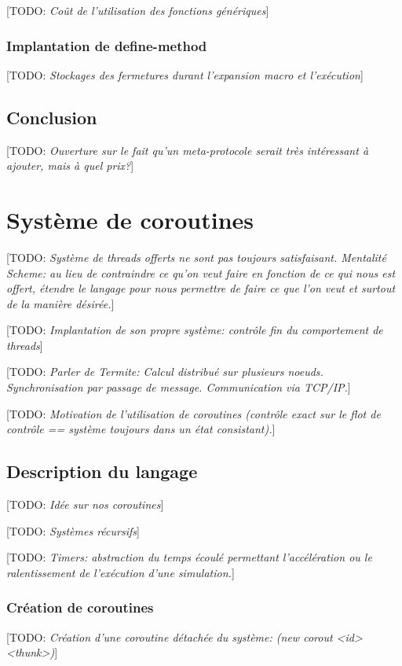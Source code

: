 \documentclass[12pt,oneside,letterpaper,francais]{book}
\newcommand{\todo}[1]{[TODO: {\it #1}]}
\begin{document}
\todo{Coût de l'utilisation des fonctions génériques}

\subsection{Implantation de define-method}
\todo{Stockages des fermetures durant l'expansion macro et l'exécution}




\section{Conclusion}
\todo{Ouverture sur le fait qu'un meta-protocole serait très intéressant à
  ajouter, mais à quel prix?}



\chapter{Système de coroutines}
\todo{Système de threads offerts ne sont pas toujours
  satisfaisant. Mentalité Scheme: au lieu de contraindre ce qu'on veut
  faire en fonction de ce qui nous est offert, étendre le langage pour
  nous permettre de faire ce que l'on veut et surtout de la manière
  désirée.}

\todo{Implantation de son propre système: contrôle fin du comportement
  de threads}

\todo{Parler de Termite: Calcul distribué sur plusieurs
  noeuds. Synchronisation par passage de message. Communication via
  TCP/IP.}

\todo{Motivation de l'utilisation de coroutines (contrôle exact sur le
  flot de contrôle == système toujours dans un état consistant).}

\section{Description du langage}
\todo{Idée sur nos coroutines}

\todo{Systèmes récursifs}

\todo{Timers: abstraction du temps écoulé permettant l'accélération ou
  le ralentissement de l'exécution d'une simulation.}

\subsection{Création de coroutines}
\todo{Création d'une coroutine détachée du système: (new corout <id>
  <thunk>)}
\end{document}
